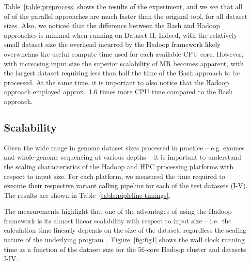 \documentclass[10pt]{article}
\newcommand{\COMMENT}[1]{{\color{red} #1 }}
\newcommand{\COM}[1]{{\color{blue} #1 }}
\begin{document}

Table~\ref{table:preprocess} shows the results of the experiment, and we see that all 
of of the parallel approaches are much faster than the original tool, for
all dataset sizes.  Also, we noticed that the difference between the Bash and Hadoop
approaches is minimal when running on Dataset II\@.  Indeed, with the relatively
small dataset size the overhead incurred by the Hadoop framework likely
overwhelms the useful compute time used for each available CPU core. However,
with increasing input size the superior scalability of MR becomes apparent, with
the largest dataset requiring less than half the time of the Bash
approach to be processed. At the same time, it is important to also notice that
the Hadoop approach employed approx.\ 1.6 times more CPU time compared to the
Bash approach.


\subsection*{Scalability}
Given the wide range in genome dataset sizes processed in practice -- e.g.
exomes and whole-genome sequencing at various depths -- it is
important to understand the scaling characteristics of the Hadoop and HPC processing
platforms with respect to input size. For each platform, we
measured the time required to execute their respective variant calling
pipeline for each of the test datasets (I-V). The results are
shown in Table~\ref{table:pipleline-timings}.

The measurements highlight that one of the advantages of using the Hadoop framework is
its almost linear scalability with respect to input size -- i.e.\ the
calculation time linearly depends on the size of the
dataset, regardless the scaling nature of the underlying program~\cite{Langmead:2009kx,Pireddu:2011vn}.
Figure~\ref{fig:fig1} shows the wall clock
running time as a function of the dataset size for the 56-core Hadoop cluster and datasets
I-IV.
\end{document}
